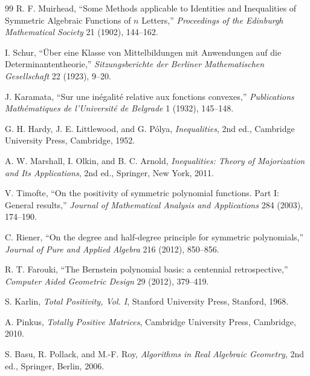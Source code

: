\documentclass[11pt]{article}
\theoremstyle{definition}
\begin{document}
\begin{thebibliography}{99}
R. F. Muirhead,
``Some Methods applicable to Identities and Inequalities of Symmetric Algebraic Functions of $n$ Letters,''
\emph{Proceedings of the Edinburgh Mathematical Society} 21 (1902), 144--162.

I. Schur,
``\"Uber eine Klasse von Mittelbildungen mit Anwendungen auf die Determinantentheorie,''
\emph{Sitzungsberichte der Berliner Mathematischen Gesellschaft} 22 (1923), 9--20.

J. Karamata,
``Sur une in\'egalit\'e relative aux fonctions convexes,''
\emph{Publications Math\'ematiques de l'Universit\'e de Belgrade} 1 (1932), 145--148.

G. H. Hardy, J. E. Littlewood, and G. P\'{o}lya,
\emph{Inequalities}, 2nd ed., Cambridge University Press, Cambridge, 1952.

A. W. Marshall, I. Olkin, and B. C. Arnold,
\emph{Inequalities: Theory of Majorization and Its Applications}, 2nd ed.,
Springer, New York, 2011.

V. Timofte,
``On the positivity of symmetric polynomial functions. Part I: General results,''
\emph{Journal of Mathematical Analysis and Applications} 284 (2003), 174--190.

C. Riener,
``On the degree and half-degree principle for symmetric polynomials,''
\emph{Journal of Pure and Applied Algebra} 216 (2012), 850--856.

R. T. Farouki,
``The Bernstein polynomial basis: a centennial retrospective,''
\emph{Computer Aided Geometric Design} 29 (2012), 379--419.

S. Karlin,
\emph{Total Positivity, Vol. I}, Stanford University Press, Stanford, 1968.

A. Pinkus,
\emph{Totally Positive Matrices}, Cambridge University Press, Cambridge, 2010.

S. Basu, R. Pollack, and M.-F. Roy,
\emph{Algorithms in Real Algebraic Geometry}, 2nd ed., Springer, Berlin, 2006.
\end{thebibliography}
\end{document}
